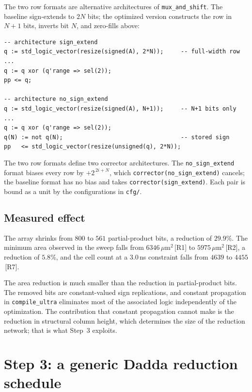 \documentclass[11pt,a4paper]{article}
\newcommand{\umarea}{\ensuremath{\,\mu\mathrm{m}^{2}}}
\newcommand{\src}[1]{\,{\footnotesize\color{accent}[#1]}}
\begin{document}
The two row formats are alternative architectures of \texttt{mux\_and\_shift}.
The baseline sign-extends to $2N$ bits; the optimized version constructs the row
in $N+1$ bits, inverts bit $N$, and zero-fills above:

\begin{lstlisting}[style=vhdl]
-- architecture sign_extend
q := std_logic_vector(resize(signed(A), 2*N));     -- full-width row
...
q := q xor (q'range => sel(2));
pp <= q;

-- architecture no_sign_extend
q := std_logic_vector(resize(signed(A), N+1));     -- N+1 bits only
...
q := q xor (q'range => sel(2));
q(N) := not q(N);                                  -- stored sign
pp   <= std_logic_vector(resize(unsigned(q), 2*N));
\end{lstlisting}

The two row formats define two corrector architectures. The
\texttt{no\_sign\_extend} format biases every row by $+2^{\,2i+N}$, which
\texttt{corrector(no\_sign\_extend)} cancels; the baseline format has no bias and
takes \texttt{corrector(sign\_extend)}. Each pair is bound as a unit by the
configurations in \texttt{cfg/}.

\subsection{Measured effect}

The array shrinks from $800$ to $561$ partial-product bits, a reduction of
$29.9\%$. The minimum area observed in the sweep falls from
$6346\umarea$\src{R1} to $5975\umarea$\src{R2},
a reduction of $5.8\%$, and the cell count at a $3.0$\,ns constraint falls from
$4639$ to $4455$\src{R7}.

The area reduction is much smaller than the reduction in partial-product bits.
The removed bits are constant-valued sign replications, and constant propagation
in \texttt{compile\_ultra} eliminates most of the associated logic independently
of the optimization. The contribution that constant propagation cannot make is
the reduction in structural column height, which determines the size of the
reduction network; that is what Step~3 exploits.

\section{Step 3: a generic Dadda reduction schedule}
\label{sec:opt2}
\end{document}
